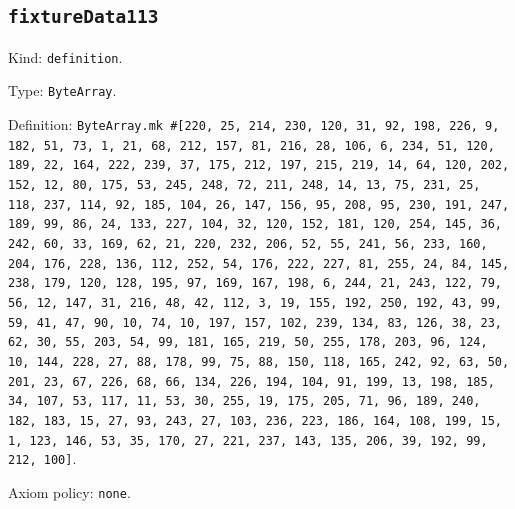 \documentclass[11pt]{article}
\begin{document}
\subsection*{\texttt{fixtureData113}}
\noindent Kind: \texttt{definition}.\par
\noindent Type: \texttt{ByteArray}.\par
\noindent Definition: \texttt{ByteArray.mk \#[220, 25, 214, 230, 120, 31, 92, 198, 226, 9, 182, 51, 73, 1, 21, 68, 212, 157, 81, 216, 28, 106, 6, 234, 51, 120, 189, 22, 164, 222, 239, 37, 175, 212, 197, 215, 219, 14, 64, 120, 202, 152, 12, 80, 175, 53, 245, 248, 72, 211, 248, 14, 13, 75, 231, 25, 118, 237, 114, 92, 185, 104, 26, 147, 156, 95, 208, 95, 230, 191, 247, 189, 99, 86, 24, 133, 227, 104, 32, 120, 152, 181, 120, 254, 145, 36, 242, 60, 33, 169, 62, 21, 220, 232, 206, 52, 55, 241, 56, 233, 160, 204, 176, 228, 136, 112, 252, 54, 176, 222, 227, 81, 255, 24, 84, 145, 238, 179, 120, 128, 195, 97, 169, 167, 198, 6, 244, 21, 243, 122, 79, 56, 12, 147, 31, 216, 48, 42, 112, 3, 19, 155, 192, 250, 192, 43, 99, 59, 41, 47, 90, 10, 74, 10, 197, 157, 102, 239, 134, 83, 126, 38, 23, 62, 30, 55, 203, 54, 99, 181, 165, 219, 50, 255, 178, 203, 96, 124, 10, 144, 228, 27, 88, 178, 99, 75, 88, 150, 118, 165, 242, 92, 63, 50, 201, 23, 67, 226, 68, 66, 134, 226, 194, 104, 91, 199, 13, 198, 185, 34, 107, 53, 117, 11, 53, 30, 255, 19, 175, 205, 71, 96, 189, 240, 182, 183, 15, 27, 93, 243, 27, 103, 236, 223, 186, 164, 108, 199, 15, 1, 123, 146, 53, 35, 170, 27, 221, 237, 143, 135, 206, 39, 192, 99, 212, 100]}.\par
\noindent Axiom policy: \texttt{none}.\par
\end{document}
